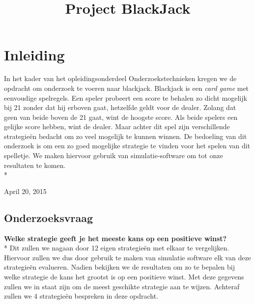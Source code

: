 \documentclass[conference]{IEEEtran}
\begin{document}
\title{Project BlackJack}
\author{
}
\maketitle



\IEEEpeerreviewmaketitle

\section{Inleiding}
In het kader van het opleidingsonderdeel Onderzoekstechnieken kregen we de opdracht om onderzoek te voeren naar blackjack. Blackjack is een {\it card game} met eenvoudige spelregels. Een speler probeert een score te behalen zo dicht mogelijk bij 21 zonder dat hij erboven gaat, hetzelfde geldt voor de dealer. Zolang dat geen van beide boven de 21 gaat, wint de hoogste score. Als beide spelers een gelijke score hebben, wint de dealer.
Maar achter dit spel zijn verschillende strategie\"en bedacht om zo veel mogelijk te kunnen winnen. De bedoeling van dit onderzoek is om een zo goed mogelijke strategie te vinden voor het spelen van dit spelletje. We maken hiervoor gebruik van simulatie-software om tot onze resultaten te komen.\\*
 
\hfill April 20, 2015

\subsection{Onderzoeksvraag}
\textbf{Welke strategie geeft je het meeste kans op een positieve winst?}\\*
Dit zullen we nagaan door 12 eigen strategie\"en met elkaar te vergelijken.
Hiervoor zullen we dus door gebruik te maken van simulatie software elk van deze strategie\"en evalueren.
Nadien bekijken we de resultaten om zo te bepalen bij welke strategie de kans het grootst is op een positieve winst. Met deze gegevens zullen we in staat zijn om de meest geschikte strategie aan te wijzen.
Achteraf zullen we 4 strategie\"en bespreken in deze opdracht.
\end{document}

